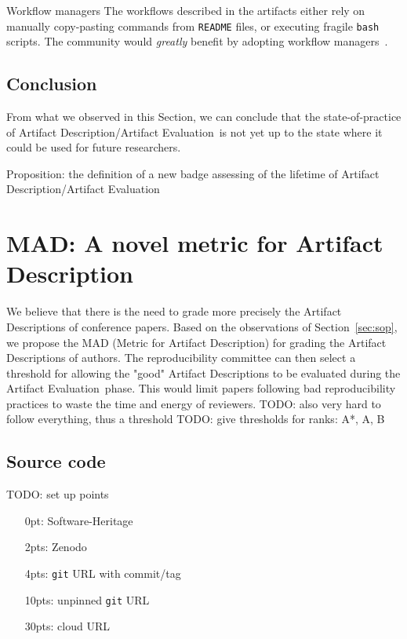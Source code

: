 \documentclass[sigconf]{acmart}
\newcommand{\ad}{Artifact Description}
\newcommand{\aeval}{Artifact Evaluation}
\newcommand{\adae}{\ad/\aeval}
\newcommand{\todo}[1]{{\color{red}TODO: #1}}
\begin{document}
\begin{lesson}{Workflow managers}{}
  The workflows described in the artifacts either rely on manually copy-pasting commands from \texttt{README} files, or executing fragile \texttt{bash} scripts.
  The community would \emph{greatly} benefit by adopting workflow managers\ \cite{wratten2021reproducible}.
\end{lesson}

\subsection{Conclusion}\label{sec:sop:conclu}

From what we observed in this Section, we can conclude that the state-of-practice of \adae\ is not yet up to the state where it could be used for future researchers.

Proposition: the definition of a new badge assessing of the lifetime of \adae


%
\section{MAD: A novel metric for \ad}

We believe that there is the need to grade more precisely the \ad s of conference papers.
Based on the observations of Section\ \ref{sec:sop}, we propose the MAD (Metric for \ad) for grading the \ad s of authors.
The reproducibility committee can then select a threshold for allowing the "good" \ad s to be evaluated during the \aeval\ phase.
This would limit papers following bad reproducibility practices to waste the time and energy of reviewers.
\todo{also very hard to follow everything, thus a threshold}
\todo{give thresholds for ranks: A*, A, B}


\subsection{Source code}

\todo{set up points}

\begin{itemize}
  \item[0pt:] Software-Heritage
  \item[2pts:] Zenodo
  \item[4pts:] \texttt{git} URL with commit/tag
  \item[10pts:] unpinned \texttt{git} URL
  \item[30pts:] cloud URL
\end{itemize}
\end{document}
